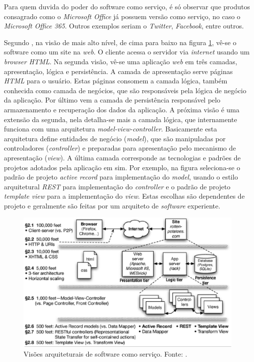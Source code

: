 	Para quem duvida do poder do software como serviço, é só observar que produtos consagrado como o \emph{Microsoft Office} já possuem versão como serviço, no caso o \emph{Microsoft Office 365}. Outros exemplos seriam o \emph{Twitter}, \emph{Facebook}, entre outros.
	

Segundo , na visão de mais alto nível, de cima para baixo na figura \ref{saas_view}, vê-se o software como um site na \emph{web}. 
O cliente acessa o servidor via \emph{internet} usando um \emph{browser HTML}. 
Na segunda visão, vê-se uma aplicação \emph{web} em três camadas, apresentação, lógica e persistência.
A camada de apresentação serve páginas \emph{HTML} para o usuário. Estas páginas consomem a camada lógica, também conhecida como camada de negócios, que são responsáveis pela lógica de negócio da aplicação. Por último vem a camada de persistência responsável pelo armazenamento e recuperação dos dados da aplicação.
A próxima visão é uma extensão da segunda, nela detalha-se mais a camada lógica, que internamente funciona com uma arquitetura \emph{model-view-controller}. 
Basicamente esta arquitetura define entidades de negócio (\emph{model}), que são manipuladas por controladores (\emph{controller}) e preparadas para apresentação pelo mecanismo de apresentação (\emph{view}).
A última camada corresponde as tecnologias e padrões de projetos adotados pela aplicação em sim. Por exemplo, na figura seleciona-se o padrão de projeto \emph{active record} para implementação do \emph{model},  usando o estilo arquitetural \emph{REST} para implementação do \emph{controller} e o padrão de projeto \emph{template view} para a implementação do \emph{view}. Estas escolhas são dependentes de projeto e geralmente são feitas por um arquiteto de \emph{software} experiente. 

\begin{figure}[ht]
	\centering
	\includegraphics[width=15 cm]{figuras/saas_view.eps}
	\caption{Visões arquiteturais de software como serviço. Fonte: .}
    	\label{saas_view}
\end{figure}


